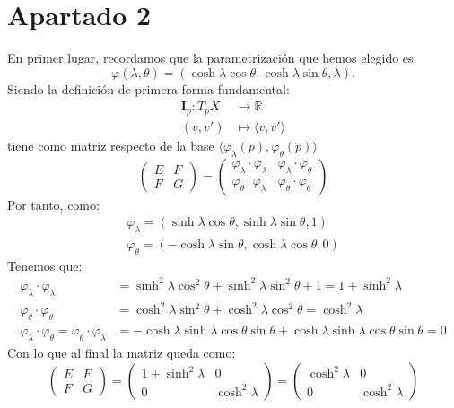 \section{Apartado 2}
En primer lugar, recordamos que la parametrización que hemos elegido es:
\[
\varphi\left( \lambda, \theta \right) = \left( \cosh \lambda \cos \theta,
\cosh \lambda \sin \theta, \lambda \right).
\]
Siendo la definición de primera forma fundamental:
\begin{align*}
    \mathbf{I}_p: T_pX &\rightarrow \mathbb{R}\\
    \left( v, v' \right) &\mapsto \langle v, v' \rangle
\end{align*}
tiene como matriz respecto de la base $\langle \varphi_{\lambda}\left( p \right),
\varphi_{\theta}\left( p \right) \rangle$
\[
    \begin{pmatrix} E & F\\ F & G \end{pmatrix} = \begin{pmatrix} 
    \varphi_{\lambda} \cdot \varphi_{\lambda} & \varphi_{\lambda} \cdot \varphi_{\theta}\\
    \varphi_{\theta} \cdot \varphi_{\lambda} & \varphi_{\theta} \cdot
    \varphi_{\theta}
    \end{pmatrix}
\]
Por tanto, como:
\begin{gather*}
    \varphi_{\lambda} = \left( \sinh \lambda \cos \theta, \sinh \lambda \sin
    \theta, 1 \right)\\
    \varphi_{\theta} = \left( -\cosh \lambda \sin \theta, \cosh \lambda \cos
    \theta, 0 \right)
\end{gather*}
Tenemos que:
\begin{align*}
    \varphi_{\lambda} \cdot \varphi_{\lambda} &= \sinh^2 \lambda \cos^2 \theta +
    \sinh^2 \lambda \sin^2 \theta + 1 = 1 + \sinh^2 \lambda\\
    \varphi_{\theta} \cdot \varphi_{\theta} &= \cosh^2 \lambda \sin^2 \theta +
    \cosh^2 \lambda \cos^2 \theta = \cosh^2 \lambda\\
    \varphi_{\lambda} \cdot \varphi_{\theta} = \varphi_{\theta} \cdot
    \varphi_{\lambda} &= -\cosh \lambda \sinh \lambda \cos \theta \sin \theta +
    \cosh \lambda \sinh \lambda \cos \theta \sin \theta = 0
\end{align*}
Con lo que al final la matriz queda como:
\[
    \begin{pmatrix} E & F\\ F & G \end{pmatrix} = \begin{pmatrix} 
    1 + \sinh^2 \lambda & 0\\
    0 & \cosh^2 \lambda
    \end{pmatrix} = \begin{pmatrix} 
    \cosh^2 \lambda & 0\\
    0 & \cosh^2 \lambda
    \end{pmatrix}
\]
